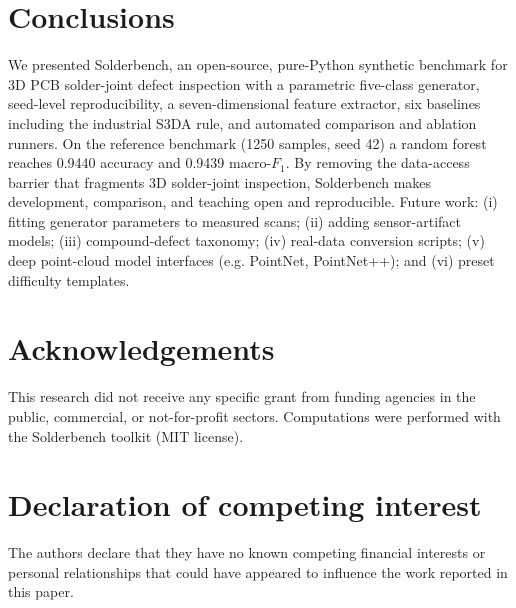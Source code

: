 \documentclass[3p]{elsarticle}
\begin{document}
\section{Conclusions}
We presented Solderbench, an open-source, pure-Python synthetic benchmark for 3D PCB solder-joint defect inspection with a parametric five-class generator, seed-level reproducibility, a seven-dimensional feature extractor, six baselines including the industrial S3DA rule, and automated comparison and ablation runners. On the reference benchmark (1250 samples, seed 42) a random forest reaches 0.9440 accuracy and 0.9439 macro-$F_1$. By removing the data-access barrier that fragments 3D solder-joint inspection, Solderbench makes development, comparison, and teaching open and reproducible. Future work: (i) fitting generator parameters to measured scans; (ii) adding sensor-artifact models; (iii) compound-defect taxonomy; (iv) real-data conversion scripts; (v) deep point-cloud model interfaces (e.g. PointNet, PointNet++); and (vi) preset difficulty templates.
\section{Acknowledgements}
This research did not receive any specific grant from funding agencies in the public, commercial, or not-for-profit sectors. Computations were performed with the Solderbench toolkit (MIT license).

\section*{Declaration of competing interest}
The authors declare that they have no known competing financial interests or personal relationships that could have appeared to influence the work reported in this paper.
\end{document}
